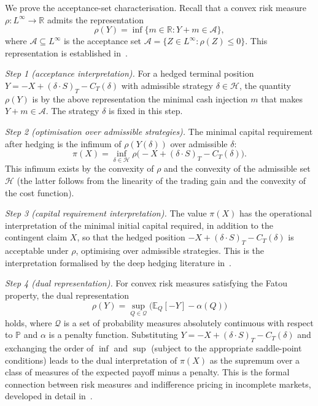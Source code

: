 \documentclass[12pt,a4paper]{article}
\theoremstyle{definition}
\theoremstyle{plain}
\theoremstyle{remark}
\theoremstyle{plain}
\begin{document}
We prove the acceptance-set characterisation. Recall that a convex risk
measure $\rho : L^\infty \to \mathbb{R}$ admits the representation
\[
\rho(Y) = \inf\{ m \in \mathbb{R} : Y + m \in \mathcal{A} \},
\]
where $\mathcal{A} \subseteq L^\infty$ is the acceptance set
$\mathcal{A} = \{Z \in L^\infty : \rho(Z) \leq 0\}$. This
representation is established in~\cite{FoellmerSchied2016}.

\textit{Step 1 (acceptance interpretation).} For a hedged terminal
position $Y = -X + (\delta \cdot S)_T - C_T(\delta)$ with admissible
strategy $\delta \in \mathcal{H}$, the quantity $\rho(Y)$ is by the
above representation the minimal cash injection $m$ that makes
$Y + m \in \mathcal{A}$. The strategy $\delta$ is fixed in this step.

\textit{Step 2 (optimisation over admissible strategies).} The minimal
capital requirement after hedging is the infimum of $\rho(Y(\delta))$
over admissible $\delta$:
\[
\pi(X) = \inf_{\delta \in \mathcal{H}}
\rho\bigl(-X + (\delta \cdot S)_T - C_T(\delta)\bigr).
\]
This infimum exists by the convexity of $\rho$ and the convexity of the
admissible set $\mathcal{H}$ (the latter follows from the linearity of
the trading gain and the convexity of the cost function).

\textit{Step 3 (capital requirement interpretation).} The value
$\pi(X)$ has the operational interpretation of the minimal initial
capital required, in addition to the contingent claim $X$, so that the
hedged position
$-X + (\delta \cdot S)_T - C_T(\delta)$ is acceptable under $\rho$,
optimising over admissible strategies. This is the interpretation
formalised by the deep hedging literature
in~\cite{Buehler2019DeepHedging}.

\textit{Step 4 (dual representation).} For convex risk measures
satisfying the Fatou property, the dual representation
\[
\rho(Y) = \sup_{Q \in \mathcal{Q}}\bigl(\mathbb{E}_Q[-Y] - \alpha(Q)\bigr)
\]
holds, where $\mathcal{Q}$ is a set of probability measures absolutely
continuous with respect to $\mathbb{P}$ and $\alpha$ is a penalty
function. Substituting $Y = -X + (\delta \cdot S)_T - C_T(\delta)$ and
exchanging the order of $\inf$ and $\sup$ (subject to the appropriate
saddle-point conditions) leads to the dual interpretation of $\pi(X)$
as the supremum over a class of measures of the expected payoff minus
a penalty. This is the formal connection between risk measures and
indifference pricing in incomplete markets, developed in detail
in~\cite{FoellmerSchied2016}.

\clearpage
{}

\end{document}
